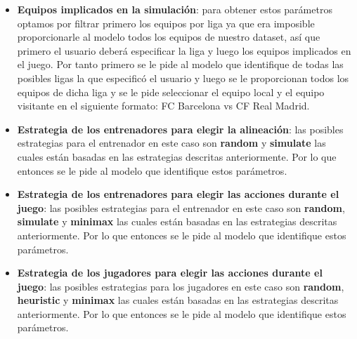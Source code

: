 \documentclass{article}
\begin{document}
\begin{itemize}
      \item \textbf{Equipos implicados en la simulación}: para obtener estos parámetros optamos por filtrar primero los
            equipos por liga ya que era imposible proporcionarle al modelo todos los equipos de nuestro dataset, así que primero
            el usuario deberá especificar la liga y luego los equipos implicados en el juego. Por tanto primero se le pide al
            modelo que identifique de todas las posibles ligas la que especificó el usuario y luego se le proporcionan todos
            los equipos de dicha liga y se le pide seleccionar el equipo local y el equipo visitante en el siguiente formato:
            FC Barcelona vs CF Real Madrid.
            
      \item \textbf{Estrategia de los entrenadores para elegir la alineación}: las posibles estrategias para el entrenador en este
            caso son \textbf{random} y \textbf{simulate} las cuales están basadas en las estrategias descritas anteriormente. Por lo
            que entonces se le pide al modelo que identifique estos parámetros.
            
      \item \textbf{Estrategia de los entrenadores para elegir las acciones durante el juego}: las posibles estrategias para el entrenador en este
            caso son \textbf{random}, \textbf{simulate} y \textbf{minimax} las cuales están basadas en las estrategias descritas anteriormente. Por lo
            que entonces se le pide al modelo que identifique estos parámetros.
            
      \item \textbf{Estrategia de los jugadores para elegir las acciones durante el juego}: las posibles estrategias para los jugadores en este
            caso son \textbf{random}, \textbf{heuristic} y \textbf{minimax} las cuales están basadas en las estrategias descritas anteriormente. Por lo
            que entonces se le pide al modelo que identifique estos parámetros.
            
\end{itemize}
\end{document}
